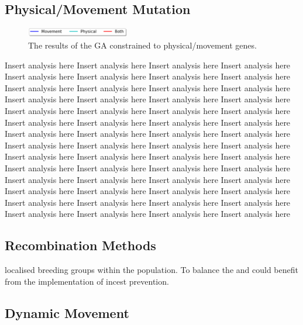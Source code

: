\documentclass{article}
\begin{document}
\subsection{Physical/Movement Mutation}
\begin{figure}
    \centering
    \vspace*{-5mm}
    \includegraphics[width=0.4\textwidth]{legend}
    \vspace*{-7mm}
    \caption{The results of the GA constrained to physical/movement genes.}
\end{figure}
Insert analysis here Insert analysis here Insert analysis here Insert analysis here Insert analysis here Insert analysis here Insert analysis here Insert analysis here Insert analysis here Insert analysis here Insert analysis here Insert analysis here Insert analysis here Insert analysis here Insert analysis here Insert analysis here Insert analysis here Insert analysis here Insert analysis here Insert analysis here Insert analysis here Insert analysis here Insert analysis here Insert analysis here Insert analysis here Insert analysis here Insert analysis here Insert analysis here Insert analysis here Insert analysis here Insert analysis here Insert analysis here Insert analysis here Insert analysis here Insert analysis here Insert analysis here Insert analysis here Insert analysis here Insert analysis here Insert analysis here Insert analysis here Insert analysis here Insert analysis here Insert analysis here Insert analysis here Insert analysis here Insert analysis here Insert analysis here Insert analysis here Insert analysis here Insert analysis here Insert analysis here Insert analysis here Insert analysis here Insert analysis here Insert analysis here

\subsection{Recombination Methods}
localised breeding groups within the population. To balance the  and could benefit from the implementation of incest prevention. 


\subsection{Dynamic Movement}
\end{document}
